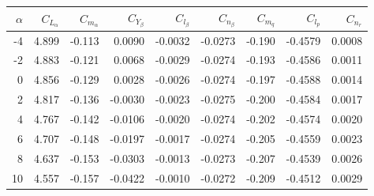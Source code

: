 \begin{tabular}{rrrrrrrrr}
  \hline
  $\alpha$ & $C_{L_\alpha}$ & $C_{m_\alpha}$ & $C_{Y_\beta}$ & $C_{l_\beta}$ & $C_{n_\beta}$ & $C_{m_q}$ & $C_{l_p}$ & $C_{n_r}$ \\
  \hline
     -4 & 4.899 & -0.113 & 0.0090 & -0.0032 & -0.0273 & -0.190 & -0.4579 & 0.0008 \\
     -2 & 4.883 & -0.121 & 0.0068 & -0.0029 & -0.0274 & -0.193 & -0.4586 & 0.0011 \\
      0 & 4.856 & -0.129 & 0.0028 & -0.0026 & -0.0274 & -0.197 & -0.4588 & 0.0014 \\
      2 & 4.817 & -0.136 & -0.0030 & -0.0023 & -0.0275 & -0.200 & -0.4584 & 0.0017 \\
      4 & 4.767 & -0.142 & -0.0106 & -0.0020 & -0.0274 & -0.202 & -0.4574 & 0.0020 \\
      6 & 4.707 & -0.148 & -0.0197 & -0.0017 & -0.0274 & -0.205 & -0.4559 & 0.0023 \\
      8 & 4.637 & -0.153 & -0.0303 & -0.0013 & -0.0273 & -0.207 & -0.4539 & 0.0026 \\
     10 & 4.557 & -0.157 & -0.0422 & -0.0010 & -0.0272 & -0.209 & -0.4512 & 0.0029 \\
  \hline
\end{tabular}
